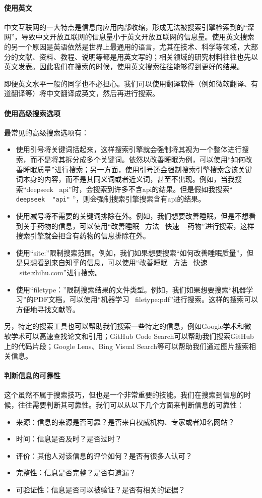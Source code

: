 \paragraph{使用英文} 中文互联网的一大特点是信息向应用内部收缩，形成无法被搜索引擎检索到的“深网”，导致中文开放互联网的信息量小于英文开放互联网的信息量。使用英文搜索的另一个原因是英语依然是世界上最通用的语言，尤其在技术、科学等领域，大部分的文献、资料、教程、说明等都是用英文写的；相关领域的研究材料往往也先以英文发表。因此我们在搜索的时候，使用英文搜索往往能够得到更好的结果。

即便英文水平一般的同学也不必担心。我们可以使用翻译软件（例如微软翻译、有道翻译等）将中文翻译成英文，然后再进行搜索。

\paragraph{使用高级搜索选项} 最常见的高级搜索选项有：
\begin{itemize}
  \item 使用引号将关键词括起来，这样搜索引擎就会强制将其视为一个整体进行搜索，而不是将其拆分成多个关键词。依然以改善睡眠为例，可以使用“如何改善睡眠质量”进行搜索；另一方面，使用引号还会强制搜索引擎搜索含该关键词本身的内容，而不是其同义词或者近义词，甚至不出现。例如，当我搜索“deepseek \ api”时，会搜索到许多不含api的结果。但是假如我搜索“ \texttt{deepseek \ "api"} ”，则会强制搜索引擎搜索含有api的结果。
  \item 使用减号将不需要的关键词排除在外。例如，我们想要改善睡眠，但是不想看到关于药物的信息，可以使用“改善睡眠 \ 方法 \ 快速 \ -药物”进行搜索，这样搜索引擎就会把含有药物的信息排除在外。
  \item 使用“site:”限制搜索范围。例如，我们如果想要搜索“如何改善睡眠质量”，但是只想看到来自知乎的信息，可以使用“改善睡眠 \ 方法 \ 快速 \ site:zhihu.com”进行搜索。
  \item 使用“filetype：”限制搜索结果的文件类型。例如，我们如果想要搜索“机器学习”的PDF文档，可以使用“机器学习 \ filetype:pdf”进行搜索。这样的搜索可以方便地寻找文献等。
\end{itemize}

另，特定的搜索工具也可以帮助我们搜索一些特定的信息，例如Google学术和微软学术可以高速查找论文和引用；GitHub Code Search可以帮助我们搜索GitHub上的代码片段；Google Lens、Bing Visual Search等可以帮助我们通过图片搜索相关信息。

\paragraph{判断信息的可靠性} 这个虽然不属于搜索技巧，但也是一个非常重要的技能。我们在搜索到信息的时候，往往需要判断其可靠性。我们可以从以下几个方面来判断信息的可靠性：
\begin{itemize}
  \item 来源：信息的来源是否可靠？是否来自权威机构、专家或者知名网站？
  \item 时间：信息是否及时？是否过时？
  \item 评价：其他人对该信息的评价如何？是否有很多人认可？
  \item 完整性：信息是否完整？是否有遗漏？
  \item 可验证性：信息是否可以被验证？是否有相关的证据？
\end{itemize}

